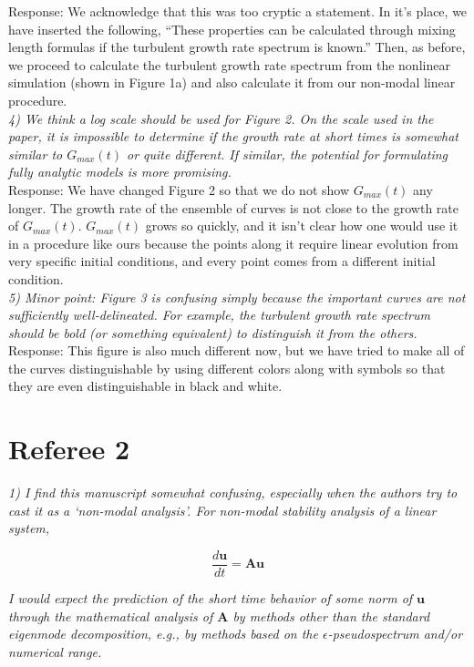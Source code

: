 \documentclass[12pt]{article}
\def\beq{\begin{equation}}
\def\eeq{\end{equation}}
\newcommand{\diff}[2]{\frac{d#1}{d#2}}
\begin{document}
Response: We acknowledge that this was too cryptic a statement. In it's place, we have inserted the following, ``These properties can be calculated through mixing length formulas if the turbulent growth rate spectrum is known.'' Then, as before, we proceed to calculate the turbulent growth rate spectrum from the nonlinear simulation (shown in Figure 1a) and also calculate it from our non-modal linear procedure. \\


\emph{4) We think a log scale should be used for Figure 2. On the scale used in the paper, it is
impossible to determine if the growth rate at short times is somewhat similar to $G_{max} (t)$
or quite different. If similar, the potential for formulating fully analytic models is more
promising.} \\

Response: We have changed Figure 2 so that we do not show $G_{max}(t)$ any longer. The growth rate of the ensemble of curves is not close to the growth rate of $G_{max}(t)$. $G_{max}(t)$  grows so quickly,
and it isn't clear how one would use it in a procedure like ours because the points along it require linear evolution from very specific initial conditions, and every point comes from a different initial condition. \\

\emph{5) Minor point: Figure 3 is confusing simply because the important curves are not
sufficiently well-delineated. For example, the turbulent growth rate spectrum should be
bold (or something equivalent) to distinguish it from the others.} \\

Response: This figure is also much different now, but we have tried to make all of the curves distinguishable by using different colors along with symbols so that they are even distinguishable in black and white.\\


\section{Referee 2}

\emph{1) I find this manuscript somewhat confusing, especially when the authors try to cast it as a ‘non-modal analysis’. For non-modal stability analysis of a linear system,}

\beq
\diff{\mathbf{u}}{t} = \mathbf{A u} \nonumber
\eeq

\emph{I would expect the prediction of the short time behavior of some norm of $\mathbf{u}$ through the mathematical analysis of $\mathbf{A}$
by methods other than the standard eigenmode decomposition, e.g., by methods based on the $\epsilon$-pseudospectrum and/or numerical range.}
\end{document}
